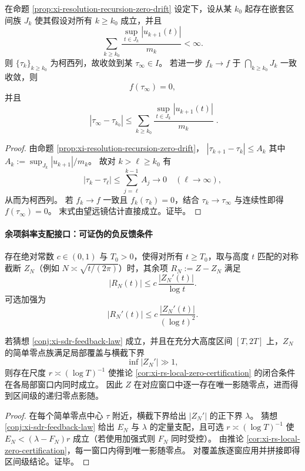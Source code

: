 \begin{theorem}[多尺度漂移可加性与零点极限存在的充分条件]\label{thm:xi-multiscale-drift-summability-limit}
在命题 \ref{prop:xi-resolution-recursion-zero-drift} 设定下，设从某 \(k_0\) 起存在嵌套区间族 \(J_k\) 使其假设对所有 \(k\ge k_0\) 成立，并且
\[
\sum_{k\ge k_0}\frac{\sup_{t\in J_k}|u_{k+1}(t)|}{m_k}<\infty.
\]
则 \(\{\tau_k\}_{k\ge k_0}\) 为柯西列，故收敛到某 \(\tau_\infty\in I\)。
若进一步 \(f_k\to f\) 于 \(\bigcap_{k\ge k_0}J_k\) 一致收敛，则
\[
f(\tau_\infty)=0,
\]
并且
\[
\boxed{\;
|\tau_\infty-\tau_{k_0}|
\le \sum_{k\ge k_0}\frac{\sup_{t\in J_k}|u_{k+1}(t)|}{m_k}\; }.
\]
\end{theorem}
\begin{proof}
由命题 \ref{prop:xi-resolution-recursion-zero-drift}，
\(
|\tau_{k+1}-\tau_k|\le A_k
\)
其中
\(
A_k:=\sup_{J_k}|u_{k+1}|/m_k
\)。
故对 \(k>\ell\ge k_0\) 有
\[
|\tau_k-\tau_\ell|\le \sum_{j=\ell}^{k-1}A_j\to 0\quad(\ell\to\infty),
\]
从而为柯西列。
若 \(f_k\to f\) 一致且 \(f_k(\tau_k)=0\)，结合 \(\tau_k\to\tau_\infty\) 与连续性即得 \(f(\tau_\infty)=0\)。
末式由望远镜估计直接成立。证毕。
\end{proof}

\paragraph{余项斜率支配接口：可证伪的负反馈条件}

\begin{conjecture}[余项斜率支配律]\label{conj:xi-sdr-feedback-law}
存在绝对常数 \(c\in(0,1)\) 与 \(T_0>0\)，使得对所有 \(t\ge T_0\)，取与高度 \(t\) 匹配的对称截断 \(Z_N\)（例如 \(N\asymp \sqrt{t/(2\pi)}\)）时，其余项 \(R_N:=Z-Z_N\) 满足
\[
|R_N(t)|\le c\,\frac{|Z_N'(t)|}{\log t}.
\]
可选加强为
\[
|R_N'(t)|\le c\,\frac{|Z_N'(t)|}{(\log t)^2}.
\]
\end{conjecture}

\begin{proposition}[斜率支配律导出的全局影随闭合框架]\label{prop:xi-sdr-implies-global-shadowing}
若猜想 \ref{conj:xi-sdr-feedback-law} 成立，并且在充分大高度区间 \([T,2T]\) 上，\(Z_N\) 的简单零点族满足局部覆盖与横截下界
\[
\inf |Z_N'|\gg 1,
\]
则存在尺度 \(r\asymp (\log T)^{-1}\) 使推论 \ref{cor:xi-rs-local-zero-certification} 的闭合条件在各局部窗口内同时成立。
因此 \(Z\) 在对应窗口中逐一存在唯一影随零点，进而得到区间级的递归零点影随。
\end{proposition}
\begin{proof}
在每个简单零点中心 \(\tau\) 附近，横截下界给出 \(|Z_N'|\) 的正下界 \(\lambda\)。
猜想 \ref{conj:xi-sdr-feedback-law} 给出 \(E_N\) 与 \(\lambda\) 的定量支配，且可选 \(r\asymp (\log T)^{-1}\) 使
\(
E_N<(\lambda-F_N)r
\)
成立（若使用加强式则 \(F_N\) 同时受控）。
由推论 \ref{cor:xi-rs-local-zero-certification}，每一窗口内得到唯一影随零点。
对覆盖族逐窗应用并拼接即得区间级结论。证毕。
\end{proof}

\endinput
